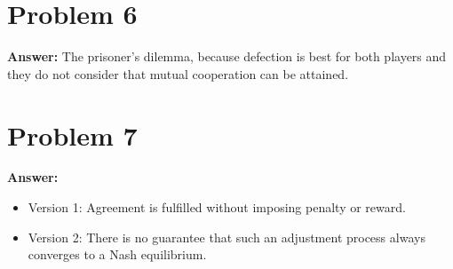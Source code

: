 \documentclass[11pt]{article}
\begin{document}
\section*{Problem 6}
\label{sec:org5955ccd}

\textbf{Answer:} The prisoner's dilemma, because defection is best for both players and
they do not consider that mutual cooperation can be attained.
\section*{Problem 7}
\label{sec:org8b93808}

\textbf{Answer:}
\begin{itemize}
\item Version 1: Agreement is fulfilled without imposing penalty or reward.
\item Version 2: There is no guarantee that such an adjustment process always
converges to a Nash equilibrium.
\end{itemize}
\end{document}
